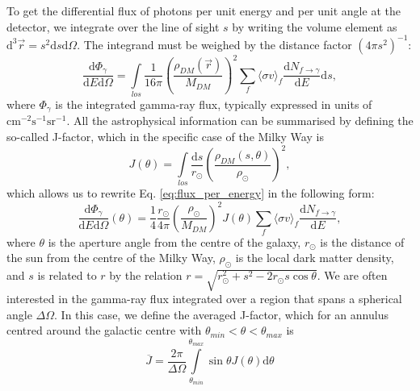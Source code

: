 To get the differential flux of photons per unit energy and per unit angle at the detector, we integrate over the line of sight \(s\) by writing the volume element as \(\mathrm{d} ^3 \vec{r}= s^2 \mathrm{d} s \mathrm{d} \Omega \). The integrand must be weighed by the distance factor \((4\pi s^2)^{-1} \):
\begin{equation}\label{eq:flux_per_energy}
	\frac{\mathrm{d}\Phi_{\gamma } }{\mathrm{d}E \mathrm{d} \Omega } = \int\limits_{los} \frac{1}{16\pi }\left( \frac{\rho_{DM} (\vec{r})}{M_{DM} } \right)^2 \sum_{f} \langle \sigma v \rangle _f \frac{\mathrm{d}N_{f\to \gamma } }{\mathrm{d}E} \mathrm{d} s,
\end{equation}
where \(\Phi_{\gamma } \) is the integrated gamma-ray flux, typically expressed in units of \(\mathrm{cm^{-2} s^{-1} sr^{-1} } \). All the astrophysical information can be summarised by defining the so-called J-factor, which in the specific case of the Milky Way is
\begin{equation}
	J(\theta ) = \int\limits_{los} \frac{\mathrm{d}s}{r_\odot} \left( \frac{\rho_{DM} (s, \theta )}{\rho_\odot} \right)^2,
\end{equation}
which allows us to rewrite Eq. \eqref{eq:flux_per_energy} in the following form:
\begin{equation}
	\frac{\mathrm{d}\Phi_{\gamma } }{\mathrm{d}E \mathrm{d} \Omega }(\theta ) = \frac{1}{4} \frac{r_\odot}{4\pi }\left( \frac{\rho_\odot}{M_{DM} } \right)^2 J (\theta ) \sum_{f}  \langle \sigma v \rangle _f \frac{\mathrm{d}N_{f\to \gamma } }{\mathrm{d}E}, 
\end{equation}
where \(\theta \) is the aperture angle from the centre of the galaxy, \(r_\odot\) is the distance of the sun from the centre of the Milky Way, \(\rho_\odot\) is the local dark matter density, and \(s\) is related to \(r\) by the relation \(r=\sqrt{r_\odot^2 + s^2 - 2 r_\odot s \cos \theta } \). We are often interested in the gamma-ray flux integrated over a region that spans a spherical angle \(\Delta \Omega \). In this case, we define the averaged J-factor, which for an annulus centred around the galactic centre with \(\theta_{min }< \theta < \theta_{max} \) is \cite{Cirelli_2024}
\begin{equation}
	\overline{J} = \frac{2\pi }{\Delta \Omega } \int\limits_{\theta_{min}}^{\theta_{max} }\sin \theta J(\theta ) \mathrm{d} \theta 
\end{equation}


